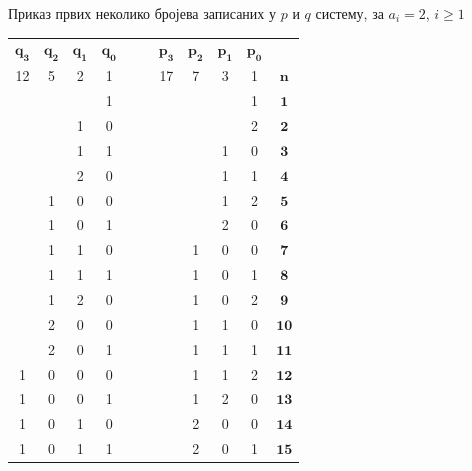 \documentclass[10pt]{beamer}
\theoremstyle{remark}
\theoremstyle{definition}
\begin{document}
	\begin{frame}{Приказ првих неколико бројева записаних у $ p $ и $ q $ систему, за $ a_{i} = 2 $, $ i \geq 1 $}
		\begin{table}[h!]
			\begin{center}
				\begin{tabular}{ | c | c | c | c | c  c | c | c | c | c | c |}
					\hline
					{$ \mathbf{q_{3}} $} &  {$ \mathbf{q_{2}} $} &  {$ \mathbf{q_{1}} $} &  {$ \mathbf{q_{0}} $} & & &  {$ \mathbf{p_{3}} $} &  {$ \mathbf{p_{2}} $} &  {$ \mathbf{p_{1}} $} &  {$ \mathbf{p_{0}} $} &\\
					12 & 5 & 2 & 1 & & & 17 & 7 & 3 & 1 &  {$ \mathbf{n} $}\\
					\hline
					&  &  & 1 & & &  &  &  & 1 & {$ \mathbf{1} $}\\
					&  & 1 & 0 & & &  &  &  & 2 & {$ \mathbf{2} $}\\
					&  & 1 & 1 & & &  &  & 1 & 0 &  {$ \mathbf{3} $}\\
					&  & 2 & 0 & & &  &  & 1 & 1 &  {$ \mathbf{4} $}\\
					& 1 & 0 & 0 & & &  &  & 1 & 2 &  {$ \mathbf{5} $}\\
					& 1 & 0 & 1 & & &  &  & 2 & 0 &  {$ \mathbf{6} $}\\
					& 1 & 1 & 0 & & &  & 1 & 0 & 0 &  {$ \mathbf{7} $}\\
					& 1 & 1 & 1 & & &  & 1 & 0 & 1 &  {$ \mathbf{8} $}\\
					& 1 & 2 & 0 & & &  & 1 & 0 & 2 &  {$ \mathbf{9} $}\\
					& 2 & 0 & 0 & & &  & 1 & 1 & 0 &  {$ \mathbf{10} $}\\
					& 2 & 0 & 1 & & &  & 1 & 1 & 1 &  {$ \mathbf{11} $}\\
					1 & 0 & 0 & 0 & & & & 1 & 1 & 2 &  {$ \mathbf{12} $}\\
					1 & 0 & 0 & 1 & & & & 1 & 2 & 0 &  {$ \mathbf{13} $}\\
					1 & 0 & 1 & 0 & & & & 2 & 0 & 0 &  {$ \mathbf{14} $}\\
					1 & 0 & 1 & 1 & & & & 2 & 0 & 1 &  {$ \mathbf{15} $}\\
					\hline 
				\end{tabular}
			\end{center}
		\end{table}
	\end{frame}
	
\end{document}
